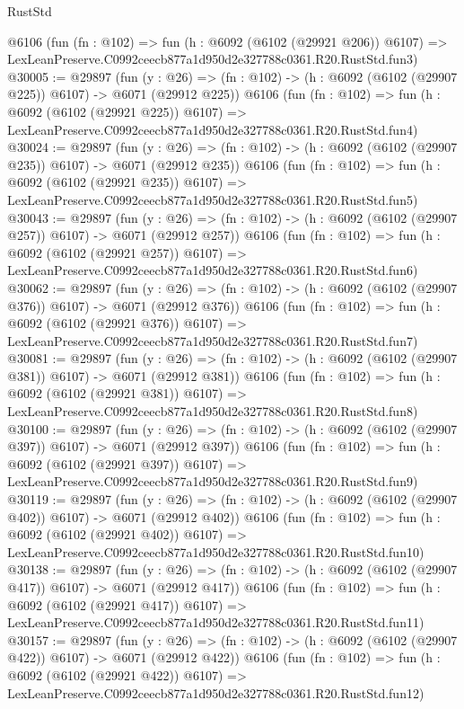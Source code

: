 \begin{lexlean}{RustStd}
\begin{coremodule}
    @6106
    (fun (fn : @102) =>
    fun (h : @6092 (@6102 (@29921 @206)) @6107) =>
    LexLeanPreserve.C0992ceecb877a1d950d2e327788c0361.R20.RustStd.fun3)
@30005 := @29897
    (fun (y : @26) => (fn : @102) -> (h : @6092 (@6102 (@29907 @225)) @6107) -> @6071 (@29912 @225))
    @6106
    (fun (fn : @102) =>
    fun (h : @6092 (@6102 (@29921 @225)) @6107) =>
    LexLeanPreserve.C0992ceecb877a1d950d2e327788c0361.R20.RustStd.fun4)
@30024 := @29897
    (fun (y : @26) => (fn : @102) -> (h : @6092 (@6102 (@29907 @235)) @6107) -> @6071 (@29912 @235))
    @6106
    (fun (fn : @102) =>
    fun (h : @6092 (@6102 (@29921 @235)) @6107) =>
    LexLeanPreserve.C0992ceecb877a1d950d2e327788c0361.R20.RustStd.fun5)
@30043 := @29897
    (fun (y : @26) => (fn : @102) -> (h : @6092 (@6102 (@29907 @257)) @6107) -> @6071 (@29912 @257))
    @6106
    (fun (fn : @102) =>
    fun (h : @6092 (@6102 (@29921 @257)) @6107) =>
    LexLeanPreserve.C0992ceecb877a1d950d2e327788c0361.R20.RustStd.fun6)
@30062 := @29897
    (fun (y : @26) => (fn : @102) -> (h : @6092 (@6102 (@29907 @376)) @6107) -> @6071 (@29912 @376))
    @6106
    (fun (fn : @102) =>
    fun (h : @6092 (@6102 (@29921 @376)) @6107) =>
    LexLeanPreserve.C0992ceecb877a1d950d2e327788c0361.R20.RustStd.fun7)
@30081 := @29897
    (fun (y : @26) => (fn : @102) -> (h : @6092 (@6102 (@29907 @381)) @6107) -> @6071 (@29912 @381))
    @6106
    (fun (fn : @102) =>
    fun (h : @6092 (@6102 (@29921 @381)) @6107) =>
    LexLeanPreserve.C0992ceecb877a1d950d2e327788c0361.R20.RustStd.fun8)
@30100 := @29897
    (fun (y : @26) => (fn : @102) -> (h : @6092 (@6102 (@29907 @397)) @6107) -> @6071 (@29912 @397))
    @6106
    (fun (fn : @102) =>
    fun (h : @6092 (@6102 (@29921 @397)) @6107) =>
    LexLeanPreserve.C0992ceecb877a1d950d2e327788c0361.R20.RustStd.fun9)
@30119 := @29897
    (fun (y : @26) => (fn : @102) -> (h : @6092 (@6102 (@29907 @402)) @6107) -> @6071 (@29912 @402))
    @6106
    (fun (fn : @102) =>
    fun (h : @6092 (@6102 (@29921 @402)) @6107) =>
    LexLeanPreserve.C0992ceecb877a1d950d2e327788c0361.R20.RustStd.fun10)
@30138 := @29897
    (fun (y : @26) => (fn : @102) -> (h : @6092 (@6102 (@29907 @417)) @6107) -> @6071 (@29912 @417))
    @6106
    (fun (fn : @102) =>
    fun (h : @6092 (@6102 (@29921 @417)) @6107) =>
    LexLeanPreserve.C0992ceecb877a1d950d2e327788c0361.R20.RustStd.fun11)
@30157 := @29897
    (fun (y : @26) => (fn : @102) -> (h : @6092 (@6102 (@29907 @422)) @6107) -> @6071 (@29912 @422))
    @6106
    (fun (fn : @102) =>
    fun (h : @6092 (@6102 (@29921 @422)) @6107) =>
    LexLeanPreserve.C0992ceecb877a1d950d2e327788c0361.R20.RustStd.fun12)

\end{coremodule}
\end{lexlean}

